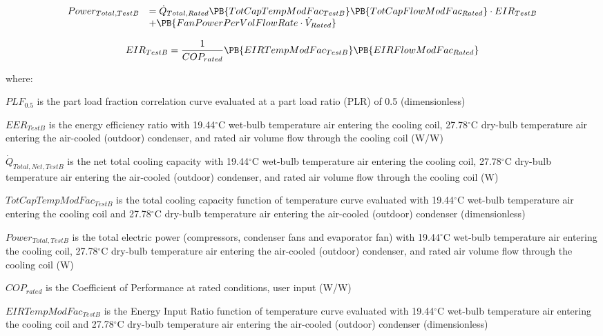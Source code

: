 \begin{equation}
  \begin{array}{rl}
    Power_{Total,TestB} &= \dot{Q}_{Total,Rated} \PB{TotCapTempModFac_{TestB}}\PB{TotCapFlowModFac_{Rated}}\cdot EIR_{TestB} \\
                        &+ \PB{FanPowerPerVolFlowRate \cdot \dot{V}_{Rated}}
  \end{array}
\end{equation}

\begin{equation}
  EIR_{TestB} = \frac{1}{COP_{rated}}\PB{EIRTempModFac_{TestB}}\PB{EIRFlowModFac_{Rated}}
\end{equation}

where:

\(PLF_{0.5}\) is the part load fraction correlation curve evaluated at a part load ratio (PLR) of 0.5 (dimensionless)

\(EER_{TestB}\) is the energy efficiency ratio with 19.44\(^{\circ}\)C wet-bulb temperature air entering the cooling coil, 27.78\(^{\circ}\)C dry-bulb temperature air entering the air-cooled (outdoor) condenser, and rated air volume flow through the cooling coil (W/W)

\({\dot Q_{Total,Net,TestB}}\) is the net total cooling capacity with 19.44\(^{\circ}\)C wet-bulb temperature air entering the cooling coil, 27.78\(^{\circ}\)C dry-bulb temperature air entering the air-cooled (outdoor) condenser, and rated air volume flow through the cooling coil (W)

\(TotCapTempModFa{c_{TestB}}\) is the total cooling capacity function of temperature curve evaluated with 19.44\(^{\circ}\)C wet-bulb temperature air entering the cooling coil and 27.78\(^{\circ}\)C dry-bulb temperature air entering the air-cooled (outdoor) condenser (dimensionless)

\(Powe{r_{Total,TestB}}\) is the total electric power (compressors, condenser fans and evaporator fan) with 19.44\(^{\circ}\)C wet-bulb temperature air entering the cooling coil, 27.78\(^{\circ}\)C dry-bulb temperature air entering the air-cooled (outdoor) condenser, and rated air volume flow through the cooling coil (W)

\(CO{P_{rated}}\) is the Coefficient of Performance at rated conditions, user input (W/W)

\(EIRTempModFa{c_{TestB}}\) is the Energy Input Ratio function of temperature curve evaluated with 19.44\(^{\circ}\)C wet-bulb temperature air entering the cooling coil and 27.78\(^{\circ}\)C dry-bulb temperature air entering the air-cooled (outdoor) condenser (dimensionless)

